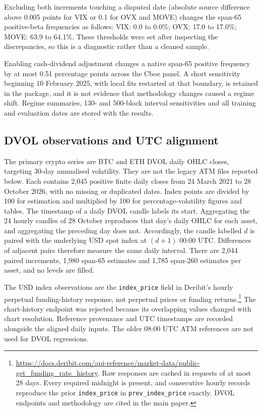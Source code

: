 Excluding both increments touching a disputed date (absolute source difference above 0.005 points for VIX or 0.1 for OVX and MOVE) changes the span-65 positive-beta frequencies as follows: VIX: 0.0 to 0.0\%; OVX: 17.0 to 17.0\%; MOVE: 63.9 to 64.1\%. These thresholds were set after inspecting the discrepancies, so this is a diagnostic rather than a cleaned sample.

Enabling cash-dividend adjustment changes a native span-65 positive frequency by at most 0.51 percentage points across the Cboe panel. A short sensitivity beginning 10 February 2025, with local fits restarted at that boundary, is retained in the package, and it is not evidence that methodology changes caused a regime shift. Regime summaries, 130- and 500-block interval sensitivities and all training and evaluation dates are stored with the results.

\subsection{DVOL observations and UTC alignment}
\label{supp:dvol}
The primary crypto series are BTC and ETH DVOL daily OHLC closes, targeting
30-day annualised volatility. They are not the legacy ATM files reported below.
Each contains 2,045 positive finite daily closes from 24 March 2021 to 28 October
2026, with no missing or duplicated dates. Index points are divided by 100 for
estimation and multiplied by 100 for percentage-volatility figures and tables.
The timestamp of a daily DVOL candle labels its start. Aggregating the 24 hourly
candles of 28 October reproduces that day's daily OHLC for each asset, and aggregating
the preceding day does not. Accordingly, the candle labelled $d$ is paired with
the underlying USD spot index at $(d+1)$ 00:00 UTC. Differences of adjacent pairs
therefore measure the same daily interval. There are 2,044 paired increments,
1,980 span-65 estimates and 1,785 span-260 estimates per asset, and no levels are filled.

The USD index observations are the \texttt{index\_price} field in Deribit's
hourly perpetual funding-history response, not perpetual prices or funding
returns.\footnote{\url{https://docs.deribit.com/api-reference/market-data/public-get_funding_rate_history}.
Raw responses are cached in requests of at most 28 days. Every required midnight
is present, and consecutive hourly records reproduce the prior \texttt{index\_price}
in \texttt{prev\_index\_price} exactly. DVOL endpoints and methodology are cited in
the main paper.} The chart-history endpoint was rejected because its overlapping
values changed with chart resolution. Reference provenance and UTC timestamps are
recorded alongside the aligned daily inputs. The older 08:00 UTC ATM references
are not used for DVOL regressions.

